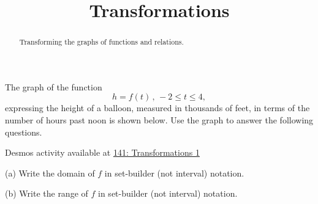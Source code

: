 \documentclass{ximera}
\title{Transformations}
\begin{document}
\begin{abstract}
Transforming the graphs of functions and relations.
\end{abstract}
\maketitle


\begin{question}  \label{Q:3d3rfff}
The graph of the function
\[
   h = f(t) \,  ,  \, -2 \leq t \leq 4,
\]
expressing the height of a balloon, measured in thousands of feet, in terms of the number of hours past noon is shown below. Use the graph to answer the following questions.


\begin{onlineOnly}
    \begin{center}
\end{center}
\end{onlineOnly}

Desmos activity available at \href{https://www.desmos.com/calculator/vr35614ucf}{141: Transformations 1}


(a) Write the domain of $f$ in set-builder (not interval) notation.

(b) Write the range of $f$ in set-builder (not interval) notation.

\end{question}
\end{document}
